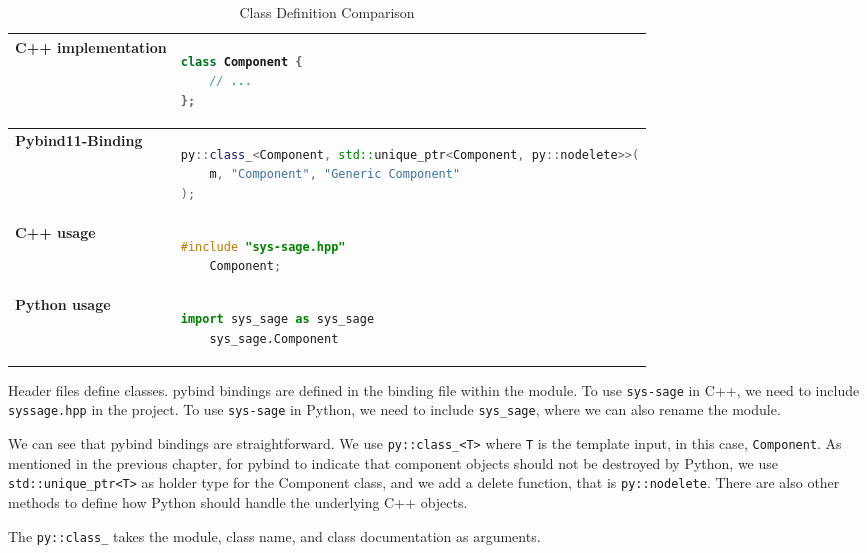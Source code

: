 \begin{table}[htbp]
\centering
\begin{tabular}{|l|l|}
\hline
\textbf{C++ implementation} &
\begin{lstlisting}[language=C++]
class Component {
    // ...
};
\end{lstlisting}
\\ \hline
\textbf{Pybind11-Binding} &
\begin{lstlisting}[language=C++]
py::class_<Component, std::unique_ptr<Component, py::nodelete>>(
    m, "Component", "Generic Component"
);
\end{lstlisting}
\\ \hline
\textbf{C++ usage} &
\begin{lstlisting}[language=C++]
    #include "sys-sage.hpp"
    Component;
\end{lstlisting}
    \\ \hline
\textbf{Python usage} &
\begin{lstlisting}[language=Python]
    import sys_sage as sys_sage
    sys_sage.Component
    \end{lstlisting}
    \\ \hline
\end{tabular}
\caption{Class Definition Comparison}
\label{tab:class_definition}
\end{table}

Header files define classes. pybind bindings are defined in the binding file within the module. To use \verb|sys-sage| in C++, we need to include \verb|syssage.hpp| in the project. To use \verb|sys-sage| in Python, we need to include \verb|sys_sage|, where we can also rename the module. 

We can see that pybind bindings are straightforward. We use \verb|py::class_<T>| where \verb|T| is the template input, in this case, \verb|Component|. As mentioned in the previous chapter, for pybind to indicate that component objects should not be destroyed by Python, we use \verb|std::unique_ptr<T>| as holder type for the Component class, and we add a delete function, that is \verb|py::nodelete|. There are also other methods to define how Python should handle the underlying C++ objects. \cite[see The Basics/Object-Oriented Code]{pybind11-docu}

The \verb|py::class_| takes the module, class name, and class documentation as arguments.


